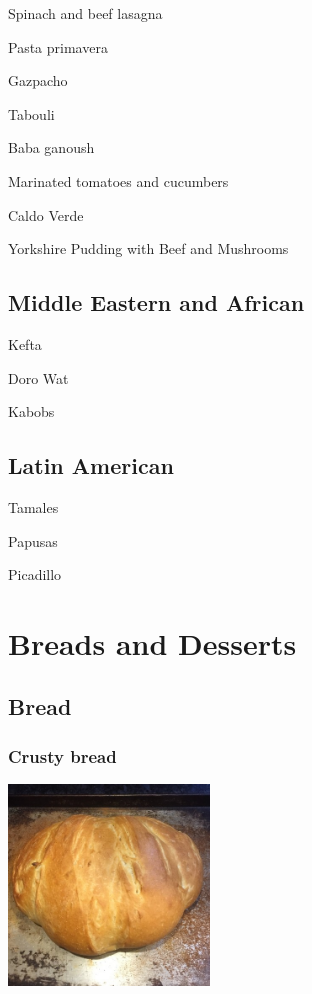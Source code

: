 \documentclass[
]{book}
\begin{document}
Spinach and beef lasagna

Pasta primavera

Gazpacho

Tabouli

Baba ganoush

Marinated tomatoes and cucumbers

Caldo Verde

Yorkshire Pudding with Beef and Mushrooms

\hypertarget{middle-eastern-and-african}{%
\section*{Middle Eastern and African}\label{middle-eastern-and-african}}

Kefta

Doro Wat

Kabobs

\hypertarget{latin-american}{%
\section*{Latin American}\label{latin-american}}

Tamales

Papusas

Picadillo

\hypertarget{breads-and-desserts}{%
\chapter*{Breads and Desserts}\label{breads-and-desserts}}

\hypertarget{bread}{%
\section*{Bread}\label{bread}}

\hypertarget{crustybread}{%
\subsection*{Crusty bread}\label{crustybread}}

\includegraphics[width=0.4\textwidth,height=\textheight]{crusty_bread_small.jpg}
\end{document}

